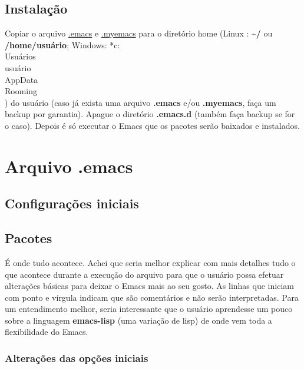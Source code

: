 \documentclass[]{article}
\begin{document}
\subsection{Instalação}\label{instalauxe7uxe3o}

Copiar o arquivo
\href{https://raw.githubusercontent.com/guaracy/emacs/master/config/.emacs}{.emacs}
e
\href{https://raw.githubusercontent.com/guaracy/emacs/master/config/.myemacs}{.myemacs}
para o diretório home (Linux : \textbf{\textasciitilde{}/} ou
\textbf{/home/usuário}; Windows: *c:\\
Usuários\\
usuário\\
AppData\\
Rooming\\
) do usuário (caso já exista uma arquivo \textbf{.emacs} e/ou
\textbf{.myemacs}, faça um backup por garantia). Apague o diretório
\textbf{.emacs.d} (também faça backup se for o caso). Depois é só
executar o Emacs que os pacotes serão baixados e instalados.

\section{Arquivo .emacs}\label{arquivo-.emacs}

\subsection{Configurações iniciais}\label{configurauxe7uxf5es-iniciais}

\subsection{Pacotes}\label{pacotes}

É onde tudo acontece. Achei que seria melhor explicar com mais detalhes
tudo o que acontece durante a execução do arquivo para que o usuário
possa efetuar alterações básicas para deixar o Emacs mais ao seu gosto.
As linhas que iniciam com ponto e vírgula indicam que são comentários e
não serão interpretadas. Para um entendimento melhor, seria interessante
que o usuário aprendesse um pouco sobre a linguagem \textbf{emacs-lisp}
(uma variação de lisp) de onde vem toda a flexibilidade do Emacs.

\subsubsection{Alterações das opções
iniciais}\label{alterauxe7uxf5es-das-opuxe7uxf5es-iniciais}
\end{document}
